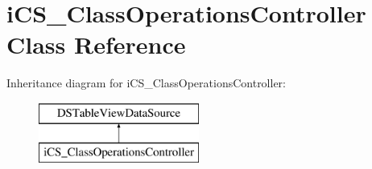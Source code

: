 \hypertarget{classi_c_s___class_operations_controller}{\section{i\+C\+S\+\_\+\+Class\+Operations\+Controller Class Reference}
\label{classi_c_s___class_operations_controller}
}
Inheritance diagram for i\+C\+S\+\_\+\+Class\+Operations\+Controller\+:\begin{figure}[H]
\begin{center}
\leavevmode
\includegraphics[height=2.000000cm]{classi_c_s___class_operations_controller}
\end{center}
\end{figure}
